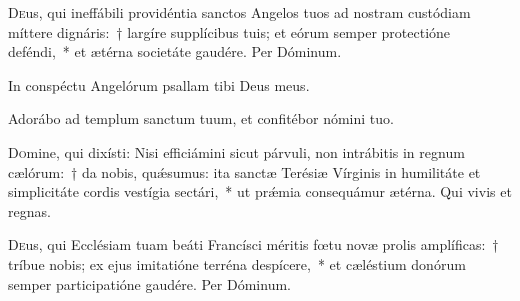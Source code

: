 \documentclass[vesperale_romanum.tex]{subfiles}
\begin{document}
\oratio

\lettrine{D}{e}us, qui ineffábili providéntia sanctos Angelos tuos ad nostram custódiam míttere dignáris:~† largíre supplícibus tuis; et eórum semper prote\-ctióne deféndi,~* et ætérna societáte gaudére.
Per Dóminum.





\vv In conspéctu Angelórum psallam tibi Deus meus.

\rr Adorábo ad templum sanctum tuum, et confitébor nómini tuo.

\admagnificat
\label{an_sancti_angeli_custodes_solesmes_1961}

\commemoration

\myrule


\duplex


\oratio

\lettrine{D}{o}mine, qui dixísti: Nisi efficiámini sicut párvuli, non intrábitis in regnum cælórum:~† da nobis, quǽsumus: ita san\-ctæ Terésiæ Vírginis in humilitáte et simplicitáte cordis vestígia se\-ctári,~* ut prǽmia consequámur ætérna.
Qui vivis et regnas.

\myrule

\newpage
{}

\duplexmajus

\oratio

\lettrine{D}{e}us, qui Ecclésiam tuam beáti Francísci méritis fœtu novæ prolis amplíficas:~† tríbue nobis; ex ejus imitatióne terréna despícere,~* et cæléstium donórum semper participatióne gaudére.
Per Dóminum.

\commsequentis

\myrule


\simplex


\oratio
\end{document}
